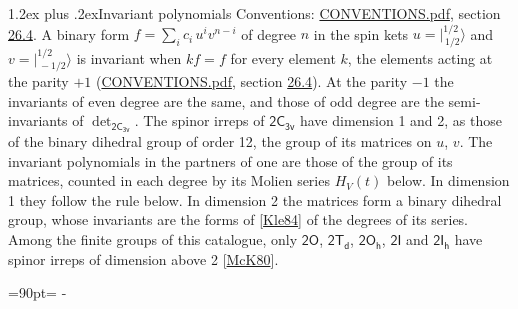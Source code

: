 \documentclass[10pt,a4paper]{article}
\makeatletter
\renewcommand\section{\@startsection{section}{1}{\z@}{-3ex plus -1ex minus -.2ex}%
  {1.2ex plus .2ex}{\normalfont\large\sffamily\bfseries\color{parttitle}}}
\newcommand{\needspace}[1]{\par\penalty-100\begingroup\dimen0=#1\relax\dimen2=\pagegoal
  \advance\dimen2-\pagetotal\ifdim\dimen0>\dimen2\relax\ifdim\dimen2>0pt\vfil\break\fi\fi
  \endgroup}
\numberwithin{equation}{section}
\newcommand{\grp}[1]{\mathsf{#1}}
\newcommand{\jm}[2]{\bigl\lvert{}^{#1}_{\,#2}\bigr\rangle}
\makeatother
\begin{document}
\section{Invariant polynomials}\label{s:invariants}
Conventions: \href{../../CONVENTIONS.pdf}{CONVENTIONS.pdf}, section \href{../../CONVENTIONS.pdf\#conv.26.4}{26.4}.
\leavevmode\label{n:local.binary.form}A binary form $f = \sum_i c_i\, u^i v^{n-i}$ of degree $n$ in the spin kets $u = \jm{1/2}{1/2}$ and $v = \jm{1/2}{-1/2}$ is invariant when $k f = f$ for every element $k$, the elements acting at the parity $+1$ (\href{../../CONVENTIONS.pdf}{CONVENTIONS.pdf}, section \href{../../CONVENTIONS.pdf\#conv.26.4}{26.4}). At the parity $-1$ the invariants of even degree are the same, and those of odd degree are the semi-invariants of $\det_{\grp{2C_{3v}}}$.
The spinor irreps of $\grp{2C_{3v}}$ have dimension 1 and 2, as those of the binary dihedral group of order 12, the group of its matrices on $u$, $v$. \label{n:function.hilbert}The invariant polynomials in the partners of one are those of the group of its matrices, counted in each degree by its Molien series $H_V(t)$ below. In dimension 1 they follow the rule below. In dimension 2 the matrices form a binary dihedral group, whose invariants are the forms of [\href{../../../REFERENCES.pdf\#ref.Kle84}{Kle84}] of the degrees of its series. Among the finite groups of this catalogue, only $\grp{2O}$, $\grp{2T_{d}}$, $\grp{2O_{h}}$, $\grp{2I}$ and $\grp{2I_{h}}$ have spinor irreps of dimension above 2 [\href{../../../REFERENCES.pdf\#ref.McK80}{McK80}].
\needspace{90pt}
\end{document}
